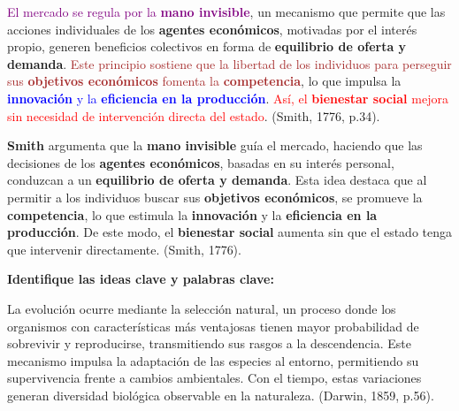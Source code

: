 \documentclass[
11pt, %
]{beamer}
\begin{document}
\begin{frame}
	\begin{block}{} %
		\textcolor{purple}{El mercado se regula por la \textbf{mano invisible}}, un mecanismo que permite que las acciones individuales de los \textbf{agentes económicos}, motivadas por el interés propio, generen beneficios colectivos en forma de \textbf{equilibrio de oferta y demanda}. \textcolor{brown}{Este principio sostiene que la libertad de los individuos para perseguir sus \textbf{objetivos económicos} fomenta la \textbf{competencia}}, lo que impulsa la \textcolor{blue}{\textbf{innovación} y la \textbf{eficiencia en la producción}}. \textcolor{red}{Así, el \textbf{bienestar social} mejora sin necesidad de intervención directa del estado}. (Smith, 1776, p.34).
	\end{block}
\end{frame}

\begin{frame}
	\begin{block}{} %
		\textbf{Smith} argumenta que la \textbf{mano invisible} guía el mercado, haciendo que las decisiones de los \textbf{agentes económicos}, basadas en su interés personal, conduzcan a un \textbf{equilibrio de oferta y demanda}. Esta idea destaca que al permitir a los individuos buscar sus \textbf{objetivos económicos}, se promueve la \textbf{competencia}, lo que estimula la \textbf{innovación} y la \textbf{eficiencia en la producción}. De este modo, el \textbf{bienestar social} aumenta sin que el estado tenga que intervenir directamente. (Smith, 1776).
	\end{block}
\end{frame}


\begin{frame}
	\textbf{Identifique las ideas clave y palabras clave:}
	\begin{block}{} %
		La evolución ocurre mediante la selección natural, un proceso donde los organismos con características más ventajosas tienen mayor probabilidad de sobrevivir y reproducirse, transmitiendo sus rasgos a la descendencia. Este mecanismo impulsa la adaptación de las especies al entorno, permitiendo su supervivencia frente a cambios ambientales. Con el tiempo, estas variaciones generan diversidad biológica observable en la naturaleza. (Darwin, 1859, p.56).
	\end{block}
\end{frame}
\end{document}
